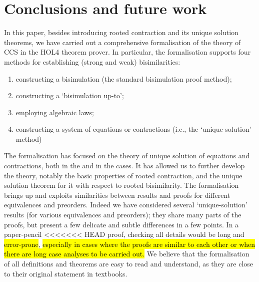 
\section{Conclusions and future work}
\label{s:concl}

In this paper, besides  introducing rooted contraction and its
unique solution theorems,
we have carried out a comprehensive formalisation of the theory of CCS in the 
HOL4 theorem prover. In particular, the formalisation supports four
methods for establishing (strong and weak) bisimilarities:
\begin{enumerate}
\item constructing a bisimulation (the standard bisimulation proof
method);
\item constructing a `bisimulation up-to'; 
\item employing algebraic laws;
\item constructing a system of equations or contractions
(i.e., the `unique-solution' method)
\end{enumerate}

The formalisation has focused on the theory of
unique solution of equations and contractions, both in the  \univariate and
in the \multivariate cases. It    
 has allowed us to further develop the theory,
notably the basic properties of rooted contraction, and the unique
solution theorem for it with respect to rooted bisimilarity. 
The formalisation brings up and exploits similarities between results
and proofs for different equivalences and preorders. Indeed we have
considered several `unique-solution' results (for various equivalences
and preorders); they share many parts of the proofs, but present a few
delicate and subtle differences in a few points. In a paper-pencil
<<<<<<< HEAD
proof, checking all details would be long and \hl{error-prone},
\hl{especially in cases where the proofs are similar to each other or
  when there are long case analyses to be carried out.}
We believe that the formalisation of  all definitions and
theorems are easy to read and
understand, as they are close to their original statement in
textbooks.

